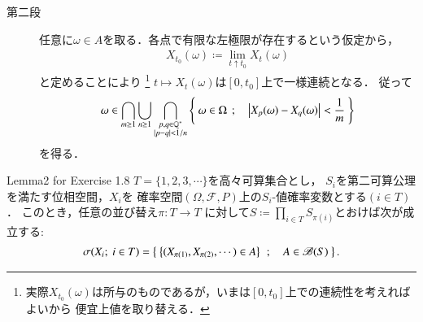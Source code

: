 \begin{prf}
\begin{description}
		\item[第二段]
			任意に$\omega \in A$を取る．各点で有限な左極限が存在するという仮定から，
			\begin{align}
				X_{t_0}(\omega) \coloneqq \lim_{t \uparrow t_0}X_t(\omega)
			\end{align}
			と定めることにより
			\footnote{
				実際$X_{t_0}(\omega)$は所与のものであるが，いまは$[0,t_0]$上での連続性を考えればよいから
				便宜上値を取り替える．
			}
			$t \longmapsto X_t(\omega)$は$[0,t_0]$上で一様連続となる．
			従って
			\begin{align}
				\omega \in \bigcap_{m \geq 1} \bigcup_{n \geq 1} \bigcap_{\substack{p,q \in \mathbb{Q}^* \\ |p-q| < 1/n}}
		\left\{\ \omega \in \Omega\ \, ; \quad \left|X_p(\omega) - X_q(\omega) \right| < \frac{1}{m}\ \right\}
			\end{align}
			を得る．
			\QED
	\end{description}
\end{prf}

\begin{itembox}[l]{Lemma2 for Exercise 1.8}
	$T = \{1,2,3,\cdots\}$を高々可算集合とし，
	$S_i$を第二可算公理を満たす位相空間，$X_i$を
	確率空間$(\Omega,\mathscr{F},P)$上の$S_i$-値確率変数とする$(i \in T)$．
	このとき，任意の並び替え$\pi:T \longrightarrow T$
	に対して$S \coloneqq \prod_{i \in T} S_{\pi(i)}$とおけば次が成立する:
	\begin{align}
		\sigma(X_i;\ i \in T) = \left\{\ \left\{ (X_{\pi(1)},X_{\pi(2)},\cdots) \in A \right\}\ \, ; \quad A \in \mathscr{B}(S)\ \right\}.
		\label{eq:lem2_for_chap_1_exercise_1_8_1}
	\end{align}
\end{itembox}

